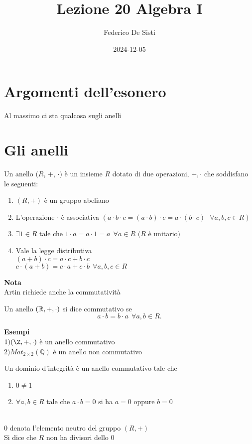 \documentclass[12px]{article}
\title{Lezione 20 Algebra I}
\date{2024-12-05}
\author{Federico De Sisti}
\begin{document}
	\maketitle
	\newpage
	\section{Argomenti dell'esonero}
	Al massimo ci sta qualcosa sugli anelli
	\section{Gli anelli}
	\begin{defi}
		Un anello $(R$, $+$, $\cdot)$ è un insieme $R$ dotato di due operazioni, $+,\cdot$ che soddisfano le seguenti:
		\begin{enumerate}
			\item $(R, + )$ è un gruppo abeliano
			\item L'operazione $\cdot$ è associativa $(a\cdot b\cdot c = (a\cdot b)\cdot c = a\cdot (b\cdot c) \ \ \ \forall a,b,c\in R) $ 
			\item $\exists 1\in R $ tale che $1\cdot a  = a \cdot 1  = a \ \ \forall a\in R$ $(R$ è unitario$)$
			\item Vale la legge distributiva \\$ (a + b)\cdot c= a\cdot c + b\cdot c$ \\
				$c\cdot (a + b) = c\cdot a + c\cdot b \ \ \forall a,b,c\in R$
		\end{enumerate}
\textbf{Nota}\\
Artin richiede  anche la commutatività

	\end{defi}
	\begin{defi}
		Un anello $(\mathbb{R},+,\cdot)$ si dice commutativo se 
		\[
		a\cdot b = b\cdot a \ \ \forall a,b\in R
		.\] 
	\end{defi}
	\textbf{Esempi}\\
	$1)(\Z, + , \cdot ) $ è un anello commutativo\\
	$2) Mat_{2\times 2}(\mathbb Q)$ è un anello non commutativo\\
	\begin{defi}
		Un dominio d'integrità è un anello commutativo tale che
		\begin{enumerate}
			\item $0\neq 1$
			\item  $\forall a,b\in R$ tale che $a\cdot b = 0$ si ha  $a = 0$ oppure $b = 0$
		\end{enumerate}\\
		$0$ denota l'elemento neutro del gruppo $(R,+)$\\
		Si dice che $R$ non ha divisori dello $0$
	\end{defi}
\end{document}
